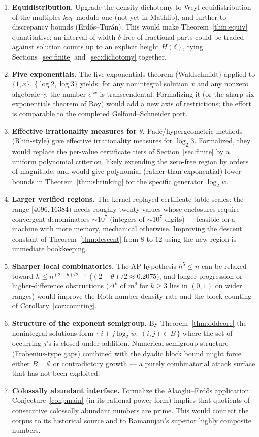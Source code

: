 \documentclass[11pt]{article}
\theoremstyle{definition}
\theoremstyle{remark}
\newcommand{\thetaq}{\theta}
\begin{document}
\begin{enumerate}
\item \textbf{Equidistribution.} Upgrade the density dichotomy to Weyl equidistribution
of the multiples $k x_0$ modulo one (not yet in Mathlib), and further to discrepancy bounds
(Erd\H{o}s--Tur\'an). This would make Theorem~\ref{thm:equiv} quantitative: an interval
of width $\delta$ free of fractional parts could be traded against solution counts up to an
explicit height
$H(\delta)$, tying Sections~\ref{sec:finite} and~\ref{sec:dichotomy} together.
\item \textbf{Five exponentials.} The five exponentials theorem (Waldschmidt) applied to
$\{1,x\}$, $\{\log 2,\log 3\}$ yields: for any nonintegral solution $x$ and any nonzero
algebraic $\gamma$, the number $e^{\gamma x}$ is transcendental. Formalizing it (or the
sharp six exponentials theorem of Roy) would add a new axis of restrictions; the effort is
comparable to the completed Gelfond--Schneider port.
\item \textbf{Effective irrationality measures for $\thetaq$.} Pad\'e/hypergeometric
methods (Rhin-style) give effective irrationality measures for $\log_2 3$. Formalized, they
would replace the per-value certificate tiers of Section~\ref{sec:finite} by a uniform
polynomial criterion, likely extending the zero-free region by orders of magnitude, and
would give polynomial (rather than exponential) lower bounds in Theorem~\ref{thm:shrinking}
for the specific generator $\log_2 w$.
\item \textbf{Larger verified regions.} The kernel-replayed certificate table scales: the
range $[4096, 16384)$ needs roughly twenty values whose enclosures require
convergent denominators ${\sim}10^7$ (integers of ${\sim}10^7$ digits) --- feasible on a
machine with more memory, mechanical otherwise. Improving the descent constant of
Theorem~\ref{thm:descent} from $8$ to $12$ using the new region is immediate bookkeeping.
\item \textbf{Sharper local combinatorics.} The AP hypothesis $h^5\le n$ can be relaxed
toward $h\le n^{(2-\thetaq)/2-\varepsilon}$ ($(2-\thetaq)/2\approx 0.2075$), and
longer-progression or higher-difference obstructions ($\Delta^k$ of $m^\thetaq$ for
$k\ge 3$ lies in $(0,1)$ on wider ranges) would improve the Roth-number density rate and the
block counting of Corollary~\ref{cor:counting}.
\item \textbf{Structure of the exponent semigroup.} By Theorem~\ref{thm:oddcore} the
nonintegral solutions form $\bigl\{\,i+j\log_2 w:\ (i,j)\in B\,\bigr\}$ where the set of
occurring $j$'s is closed under addition. Numerical semigroup structure (Frobenius-type
gaps) combined with the dyadic block bound might force either $B=\emptyset$ or contradictory
growth --- a purely combinatorial attack surface that has not been exploited.
\item \textbf{Colossally abundant interface.} Formalize the Alaoglu--Erd\H{o}s application:
Conjecture~\ref{conj:main} (in its rational-power form) implies that quotients of
consecutive colossally abundant numbers are prime. This would connect the corpus to its
historical source and to Ramanujan's superior highly composite numbers.
\end{enumerate}
\end{document}
